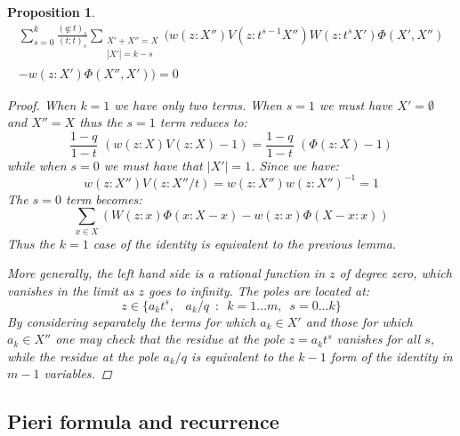 \documentclass[12pt,dvips]{amsart}
\newtheorem{proposition}{Proposition}[section]
\begin{document}
\bigskip\bigskip
\begin{proposition} \label{final}
\begin{multline*}
 \sum_{s = 0}^k \frac{(q;t)_s}{(t;t)_s} \sum_{\substack{X' + X'' = X \\ |X'| = k-s}} \Big(
w(z : X'') V(z : t^{s-1} X'') W(z : t^s X') \Phi(X',X'') \\ - w(z : X') \Phi(X'',X') \Big) = 0 
\end{multline*}
\begin{proof}
When $k=1$ we have only two terms. When $s=1$ we must have $X' = \emptyset$ and $X'' = X$ thus the $s=1$ term reduces to:
$$ \frac{1-q}{1-t} \,\, (w(z :  X) V(z : X) - 1) = \frac{1-q}{1-t} \,\, (\Phi(z : X) - 1) $$
while when $s = 0$ we must have that $|X'| = 1$. Since we have:
$$ w(z : X'') V(z : X''/t) =  w(z : X'') w(z : X'')^{-1} = 1 $$
The $s=0$ term becomes:
$$ \sum_{x \in X} \left(W(z : x) \Phi(x : X - x)- w(z : x) \Phi(X - x : x)\right) $$
Thus the $k=1$ case of the identity is equivalent to the previous lemma.

\medskip
\noindent
More generally, the left hand side is a rational function in $z$ of degree zero, which vanishes in the limit as $z$ goes to infinity.
The poles are located at:
$$z \in \{a_kt^s, \,\,\,\,\, a_k/q \,\,\,:\,\,\, k = 1 \ldots m, \,\,\, s=0 \ldots k \}$$
By considering separately the terms for which $a_k \in X'$ and those for which $a_k \in X''$ one may check that the residue at the pole $z = a_k t^s$ vanishes for all $s$, while the residue at the pole $a_k / q$ is equivalent to the $k-1$ form of the identity in $m-1$ variables.
\end{proof}
\end{proposition}


\bigskip\bigskip
\subsection{Pieri formula and recurrence}\label{pierirecurrence}
\end{document}
